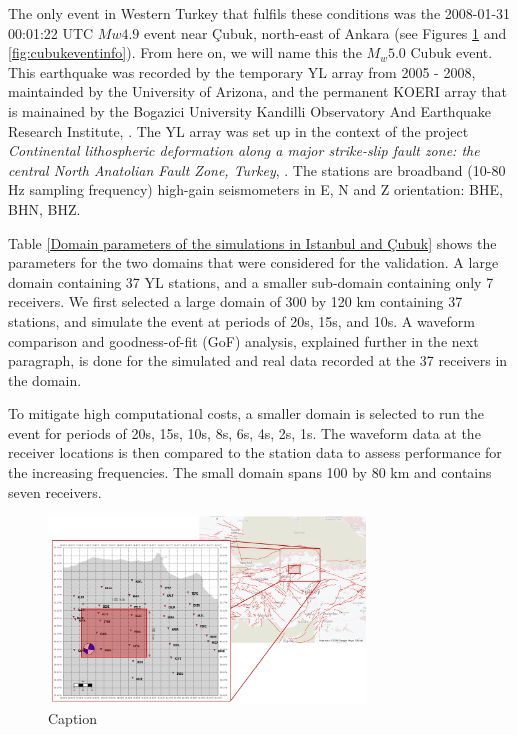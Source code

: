 \documentclass[../Text/00main.tex]{subfiles}
\begin{document}
The only event in Western Turkey that fulfils these conditions was the 2008-01-31 00:01:22 UTC $Mw 4.9$ event near Çubuk, north-east of Ankara (see Figures \ref{fig:cubuk_domain} and \ref{fig:cubukeventinfo}). From here on, we will name this the $M_w 5.0$ Cubuk event. This earthquake was recorded by the temporary YL array from 2005 - 2008, maintainded by the University of Arizona, and the permanent KOERI array that is mainained by the Bogazici University Kandilli Observatory And Earthquake Research Institute, \cite{https://doi.org/10.7914/sn/ko}. The YL array was set up in the context of the project \textit{Continental lithospheric deformation along a major strike-slip fault zone: the central North Anatolian Fault Zone, Turkey}, \cite{https://doi.org/10.7914/sn/yl_2005}. The stations are broadband (10-80 Hz sampling frequency) high-gain seismometers in E, N and Z orientation: BHE, BHN, BHZ.

Table \ref{Domain parameters of the simulations in Istanbul and Çubuk} shows the parameters for the two domains that were considered for the validation. A large domain containing 37 YL stations, and a smaller sub-domain containing only 7 receivers.  We first selected a large domain of 300 by 120 km containing 37 stations, and simulate the event at periods of 20s, 15s, and 10s. A waveform comparison and goodness-of-fit (GoF) analysis, explained further in the next paragraph, is done for the simulated and real data recorded at the 37 receivers in the domain. 

To mitigate high computational costs, a smaller domain is selected to run the event for periods of 20s, 15s, 10s, 8s, 6s, 4s, 2s, 1s. The waveform data at the receiver locations is then compared to the station data to assess performance for the increasing frequencies. The small domain spans 100 by 80 km and contains seven receivers. 


\begin{figure}
    \centering
    \includegraphics[width=0.75\textwidth]{images_methods/Overviewfig_cubuk_domain.png}
    \caption{Caption}
    \label{fig:cubuk_domain}
\end{figure}
\end{document}
